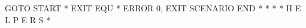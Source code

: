 \documentclass[letterpaper,10pt,english]{sphinxmanual}
\begin{document}
\begin{sphinxVerbatim}[commandchars=\\\{\}]
         GOTO\PYGZdl{} START
*\PYGZus{}\PYGZus{}\PYGZus{}\PYGZus{}\PYGZus{}\PYGZus{}\PYGZus{}\PYGZus{}\PYGZus{}\PYGZus{}\PYGZus{}\PYGZus{}\PYGZus{}\PYGZus{}\PYGZus{}\PYGZus{}\PYGZus{}\PYGZus{}\PYGZus{}\PYGZus{}\PYGZus{}\PYGZus{}\PYGZus{}\PYGZus{}\PYGZus{}\PYGZus{}\PYGZus{}\PYGZus{}\PYGZus{}\PYGZus{}\PYGZus{}\PYGZus{}\PYGZus{}\PYGZus{}\PYGZus{}\PYGZus{}\PYGZus{}\PYGZus{}\PYGZus{}\PYGZus{}\PYGZus{}\PYGZus{}\PYGZus{}\PYGZus{}\PYGZus{}\PYGZus{}\PYGZus{}\PYGZus{}\PYGZus{}\PYGZus{}\PYGZus{}\PYGZus{}\PYGZus{}\PYGZus{}\PYGZus{}\PYGZus{}\PYGZus{}\PYGZus{}\PYGZus{}\PYGZus{}\PYGZus{}\PYGZus{}\PYGZus{}\PYGZus{}\PYGZus{}\PYGZus{}\PYGZus{}\PYGZus{}\PYGZus{}\PYGZus{}
EXIT     EQU   *
         ERROR\PYGZdl{} 0,\PYGZsq{}\PYGZhy{}\PYGZhy{}\PYGZhy{} EXIT\PYGZsq{}
         SCENARIO END
*\PYGZus{}\PYGZus{}\PYGZus{}\PYGZus{}\PYGZus{}\PYGZus{}\PYGZus{}\PYGZus{}\PYGZus{}\PYGZus{}\PYGZus{}\PYGZus{}\PYGZus{}\PYGZus{}\PYGZus{}\PYGZus{}\PYGZus{}\PYGZus{}\PYGZus{}\PYGZus{}\PYGZus{}\PYGZus{}\PYGZus{}\PYGZus{}\PYGZus{}\PYGZus{}\PYGZus{}\PYGZus{}\PYGZus{}\PYGZus{}\PYGZus{}\PYGZus{}\PYGZus{}\PYGZus{}\PYGZus{}\PYGZus{}\PYGZus{}\PYGZus{}\PYGZus{}\PYGZus{}\PYGZus{}\PYGZus{}\PYGZus{}\PYGZus{}\PYGZus{}\PYGZus{}\PYGZus{}\PYGZus{}\PYGZus{}\PYGZus{}\PYGZus{}\PYGZus{}\PYGZus{}\PYGZus{}\PYGZus{}\PYGZus{}\PYGZus{}\PYGZus{}\PYGZus{}\PYGZus{}\PYGZus{}\PYGZus{}\PYGZus{}\PYGZus{}\PYGZus{}\PYGZus{}\PYGZus{}\PYGZus{}\PYGZus{}\PYGZus{}
*
*\PYGZsh{}\PYGZsh{}\PYGZsh{}\PYGZsh{}\PYGZsh{}\PYGZsh{}\PYGZsh{}\PYGZsh{}\PYGZsh{}\PYGZsh{}\PYGZsh{}\PYGZsh{}\PYGZsh{}\PYGZsh{}\PYGZsh{}\PYGZsh{}\PYGZsh{}\PYGZsh{}\PYGZsh{}\PYGZsh{}\PYGZsh{}\PYGZsh{}\PYGZsh{}\PYGZsh{}\PYGZsh{}\PYGZsh{}\PYGZsh{}\PYGZsh{}\PYGZsh{}\PYGZsh{}\PYGZsh{}\PYGZsh{}\PYGZsh{}\PYGZsh{}\PYGZsh{}\PYGZsh{}\PYGZsh{}\PYGZsh{}\PYGZsh{}\PYGZsh{}\PYGZsh{}\PYGZsh{}\PYGZsh{}\PYGZsh{}\PYGZsh{}\PYGZsh{}\PYGZsh{}\PYGZsh{}\PYGZsh{}\PYGZsh{}\PYGZsh{}\PYGZsh{}\PYGZsh{}\PYGZsh{}\PYGZsh{}\PYGZsh{}\PYGZsh{}\PYGZsh{}\PYGZsh{}\PYGZsh{}\PYGZsh{}\PYGZsh{}\PYGZsh{}\PYGZsh{}\PYGZsh{}\PYGZsh{}\PYGZsh{}\PYGZsh{}\PYGZsh{}\PYGZsh{}
*\PYGZsh{}\PYGZsh{}                          H E L P E R S                           \PYGZsh{}\PYGZsh{}
*\PYGZsh{}\PYGZsh{}\PYGZsh{}\PYGZsh{}\PYGZsh{}\PYGZsh{}\PYGZsh{}\PYGZsh{}\PYGZsh{}\PYGZsh{}\PYGZsh{}\PYGZsh{}\PYGZsh{}\PYGZsh{}\PYGZsh{}\PYGZsh{}\PYGZsh{}\PYGZsh{}\PYGZsh{}\PYGZsh{}\PYGZsh{}\PYGZsh{}\PYGZsh{}\PYGZsh{}\PYGZsh{}\PYGZsh{}\PYGZsh{}\PYGZsh{}\PYGZsh{}\PYGZsh{}\PYGZsh{}\PYGZsh{}\PYGZsh{}\PYGZsh{}\PYGZsh{}\PYGZsh{}\PYGZsh{}\PYGZsh{}\PYGZsh{}\PYGZsh{}\PYGZsh{}\PYGZsh{}\PYGZsh{}\PYGZsh{}\PYGZsh{}\PYGZsh{}\PYGZsh{}\PYGZsh{}\PYGZsh{}\PYGZsh{}\PYGZsh{}\PYGZsh{}\PYGZsh{}\PYGZsh{}\PYGZsh{}\PYGZsh{}\PYGZsh{}\PYGZsh{}\PYGZsh{}\PYGZsh{}\PYGZsh{}\PYGZsh{}\PYGZsh{}\PYGZsh{}\PYGZsh{}\PYGZsh{}\PYGZsh{}\PYGZsh{}\PYGZsh{}\PYGZsh{}

\end{sphinxVerbatim}
\end{document}
